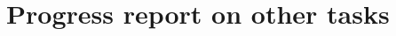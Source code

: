 \documentclass{beamer}
\begin{document}

  



\section{Progress report on other tasks}
\end{document}
